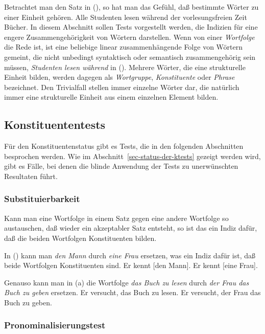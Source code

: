 Betrachtet man den Satz in (), so hat man das Gefühl, daß bestimmte Wörter zu einer
Einheit gehören.
\ea
Alle Studenten lesen während der vorlesungsfreien Zeit Bücher.
\z
In diesem Abschnitt sollen Tests vorgestellt werden, die Indizien für eine engere
Zusammengehörigkeit von Wörtern darstellen. Wenn von einer \emph{Wortfolge}
die Rede ist, ist eine beliebige linear zusammenhängende Folge von Wörtern gemeint, 
die nicht unbedingt syntaktisch oder semantisch zusammengehörig sein müssen, \zb
\emph{Studenten lesen während} in (). Mehrere Wörter, die eine strukturelle Einheit bilden,
werden dagegen als \emph{Wortgruppe}, \emph{Konstituente}
oder \emph{Phrase} bezeichnet. Den Trivialfall stellen immer einzelne Wörter dar, die
natürlich immer eine strukturelle Einheit aus einem einzelnen Element bilden.

\subsection{Konstituententests}

Für den Konstituentenstatus gibt es Tests, die in den folgenden Abschnitten besprochen werden.
Wie im Abschnitt~\ref{sec-status-der-ktests} gezeigt werden wird, gibt es Fälle, bei denen die
blinde Anwendung der Tests zu unerwünschten Resultaten führt.

\subsubsection{Substituierbarkeit}

Kann man eine Wortfolge %
in einem Satz gegen eine andere Wortfolge so austauschen, daß
wieder ein akzeptabler Satz entsteht, so ist das ein Indiz dafür, daß 
die beiden Wortfolgen Konstituenten bilden.

In () kann man \emph{den Mann} durch \emph{eine Frau} ersetzen, was ein Indiz dafür
ist, daß beide Wortfolgen Konstituenten sind.
\eal
\ex Er kennt [den Mann].
\ex Er kennt [eine Frau].
\zl

\noindent
Genauso kann man in (a) die Wortfolge \emph{das Buch zu lesen} durch
\emph{der Frau das Buch zu geben} ersetzen.
\eal
\ex Er versucht, das Buch zu lesen.\label{ex-das-buch-zu-lesen}
\ex Er versucht, der Frau das Buch zu geben.
\zl


\subsubsection{Pronominalisierungstest}

